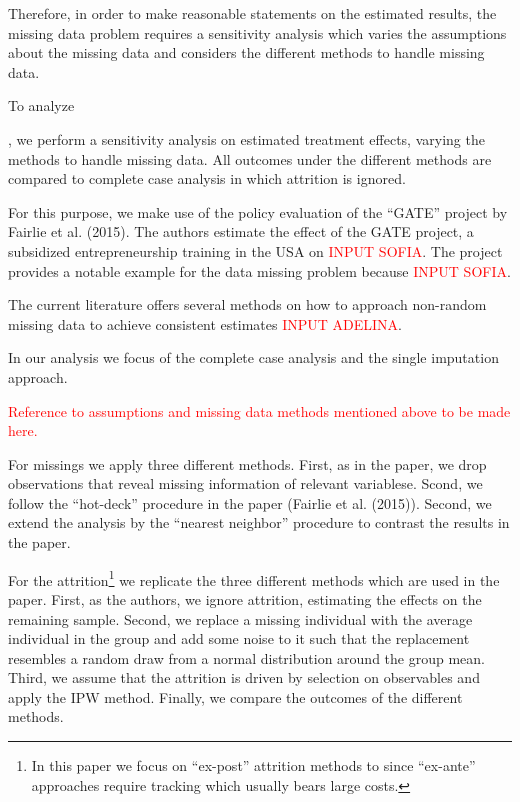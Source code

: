Therefore, in order to make reasonable statements on the estimated results, the missing data problem requires a sensitivity analysis which varies the assumptions about the missing data and considers the different methods to handle missing data.

To analyze 

, we perform a sensitivity analysis on estimated treatment effects, varying the methods to handle missing data. All outcomes under the different methods are compared to complete case analysis in which attrition is ignored. 

For this purpose, we make use of the policy evaluation of the ``\ac{GATE}'' project by Fairlie et al. (2015). The authors estimate the effect of the \ac{GATE} project, a subsidized entrepreneurship training in the USA on \textcolor{red}{INPUT SOFIA}. The project provides a notable example for the data missing problem because \textcolor{red}{INPUT SOFIA}.



The current literature offers several methods on how to approach non-random missing data to achieve consistent estimates \textcolor{red}{INPUT ADELINA}.

In our analysis we focus of the complete case analysis and the single imputation approach. 


\textcolor{red}{Reference to assumptions and missing data methods mentioned above to be made here.}

For missings we apply three different methods. First, as in the paper, we drop observations that reveal missing information of relevant variablese. Scond, we follow the ``hot-deck'' procedure in the paper (Fairlie et al. (2015)). Second, we extend the analysis by the ``nearest neighbor'' procedure to contrast the results in the paper. 

For the attrition\footnote{In this paper we focus on ``ex-post'' attrition methods to  since ``ex-ante'' approaches require tracking which usually bears large costs.} we replicate the three different methods which are used in the paper. First, as the authors, we ignore attrition, estimating the effects on the remaining sample. Second, we replace a missing individual with the average individual in the group and add some noise to it such that the replacement resembles a random draw from a normal distribution around the group mean. Third, we assume that the attrition is driven by selection on observables and apply the \ac{IPW} method. Finally, we compare the outcomes of the different methods. 
